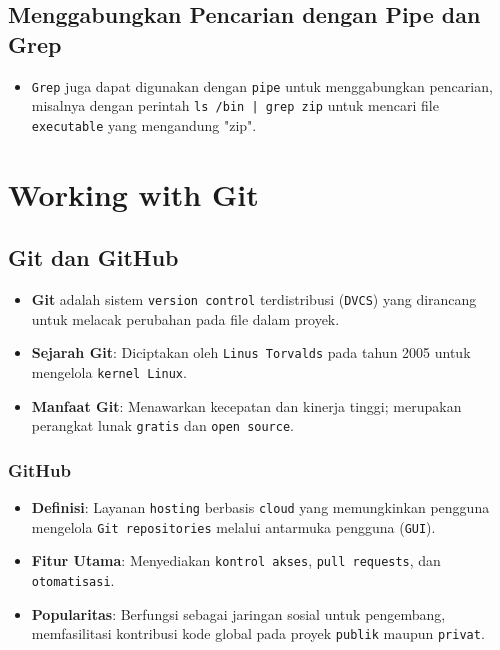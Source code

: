 \documentclass{article}
\begin{document}
\subsection{Menggabungkan Pencarian dengan Pipe dan Grep}
\begin{itemize}
    \item \texttt{Grep} juga dapat digunakan dengan \texttt{pipe} untuk menggabungkan pencarian, misalnya dengan perintah \texttt{ls /bin | grep zip} untuk mencari file \texttt{executable} yang mengandung "zip".
\end{itemize}

\newpage
\section{Working with Git}
\subsection{Git dan GitHub}
\begin{itemize}
    \item \textbf{Git} adalah sistem \texttt{version control} terdistribusi (\texttt{DVCS}) yang dirancang untuk melacak perubahan pada file dalam proyek.
    \item \textbf{Sejarah Git}: Diciptakan oleh \texttt{Linus Torvalds} pada tahun 2005 untuk mengelola \texttt{kernel Linux}.
    \item \textbf{Manfaat Git}: Menawarkan kecepatan dan kinerja tinggi; merupakan perangkat lunak \texttt{gratis} dan \texttt{open source}.
\end{itemize}

\subsubsection{GitHub}
\begin{itemize}
    \item \textbf{Definisi}: Layanan \texttt{hosting} berbasis \texttt{cloud} yang memungkinkan pengguna mengelola \texttt{Git repositories} melalui antarmuka pengguna (\texttt{GUI}).
    \item \textbf{Fitur Utama}: Menyediakan \texttt{kontrol akses}, \texttt{pull requests}, dan \texttt{otomatisasi}.
    \item \textbf{Popularitas}: Berfungsi sebagai jaringan sosial untuk pengembang, memfasilitasi kontribusi kode global pada proyek \texttt{publik} maupun \texttt{privat}.
\end{itemize}
\end{document}
